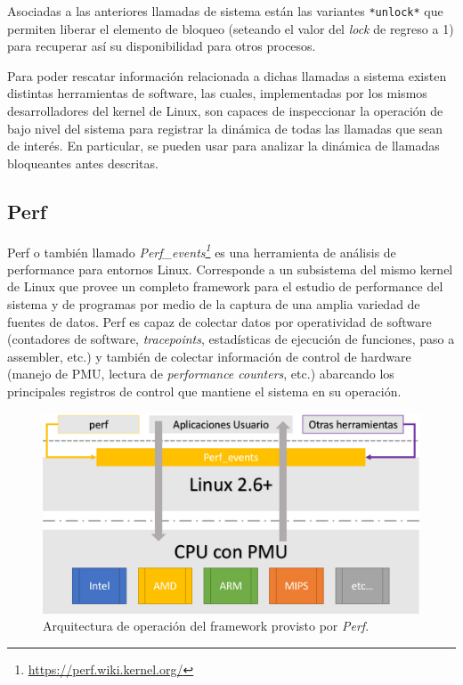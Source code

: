 Asociadas a las anteriores llamadas de sistema están las variantes \verb=*unlock*= que permiten liberar el elemento de bloqueo (seteando el valor del \emph{lock} de regreso a 1) para recuperar así su disponibilidad para otros procesos.

Para poder rescatar información relacionada a dichas llamadas a sistema existen distintas herramientas de software, las cuales, implementadas por los mismos desarrolladores del kernel de Linux, son capaces de inspeccionar la operación de bajo nivel del sistema para registrar la dinámica de todas las llamadas que sean de interés. En particular, se pueden usar para analizar la dinámica de llamadas bloqueantes antes descritas.

\subsection{Perf}
Perf \cite{slides:perfTools} o también llamado \emph{Perf\_events\footnote{\url{https://perf.wiki.kernel.org/}}} es una herramienta de análisis de performance para entornos Linux. Corresponde a un subsistema del mismo kernel de Linux que provee un completo framework para el estudio de performance del sistema y de programas por medio de la captura de una amplia variedad de fuentes de datos. Perf es capaz de colectar datos por operatividad de software (contadores de software, \emph{tracepoints}, estadísticas de ejecución de funciones, paso a assembler, etc.) y también de colectar información de control de hardware (manejo de PMU, lectura de \emph{performance counters}, etc.) abarcando los principales registros de control que mantiene el sistema en su operación.

\begin{figure}[!h]
	\centering
	\includegraphics[scale=.45]{imagenes/perfArchitecture.png}
	\caption{Arquitectura de operación del framework provisto por \emph{Perf}.}
	\label{fig:perfFramework}
\end{figure}

